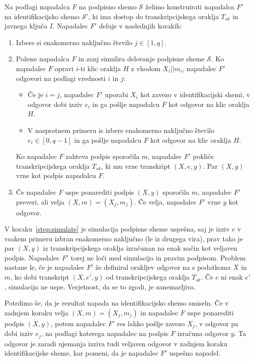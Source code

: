 \documentclass[isrm2, tisk]{fmfdelo}
\begin{document}
\begin{dokaz}
    Na podlagi napadalca $F$ na podpisno shemo $\mathcal{S}$ želimo konstruirati napadalca $F'$
    na identifikacijsko shemo $\mathcal{S'}$, ki ima dostop do transkripcijskega oraklja $T_{sk}$
    in javnega ključa $I$. Napadalec $F'$ deluje v naslednjih korakih:
    \begin{enumerate}
        \item Izbere si enakomerno naključno število $j \in [1, q]$.
        \item Požene napadalca $F$ in zanj simulira delovanje podpisne sheme $\mathcal{S}$.
            Ko napadalec $F$ opravi $i$-ti klic oraklja $H$ z vhodom $X_i || m_i$, napadalec $F'$
            odgovori na podlagi vrednosti $i$ in $j$:
            \begin{itemize}
                \item Če je $i = j$, napadalec $F'$ uporabi $X_i$ kot zavezo v identifikacijski
                    shemi, v odgovor dobi izziv $e_i$ in ga pošlje napadalcu $F$ kot odgovor na
                    klic oraklja $H$.
                \item V nasprotnem primeru is izbere enakomerno naključno število $e_i \in [0, q-1]$ in ga
                    pošlje napadalcu $F$ kot odgovor na klic oraklja $H$.
            \end{itemize}
            Ko napadalec $F$ zahteva podpis sporočila $m$, napadalec $F'$ pokliče transkripcijskega
            oraklja $T_{sk}$, ki mu vrne transkript $(X, e, y)$. Par $(X, y)$ vrne kot podpis
            napadalcu $F$.
        \label{step:simulate}
        \item Če napadalec $F$ uspe ponarediti podpis $(X, y)$ sporočila $m$, napadalec $F'$ preveri,
            ali velja $(X, m) = (X_j, m_j)$. Če velja, napadalec $F'$ vrne $y$ kot odgovor.
    \end{enumerate}
    V koraku~\ref{step:simulate} je simulacija podpisne sheme uspešna, saj je izziv $e$ v vsakem
    primeru izbran enakomerno naključno (le iz drugega vira), prav tako je par $(X, y)$ iz
    transkripcijskega oraklja izračunan na enak način kot veljaven podpis. Napadalec $F'$ torej ne
    loči med simulacijo in pravim podpisom. Problem nastane le, če je napadalec $F'$ že definiral
    orakljev odgovor na s podatkoma $X$ in $m$, ko dobi transkript $(X, e', y)$ od transkripcijskega
    oraklja $T_{sk}$. Če $e$ ni enak $e'$, simulacija ne uspe. Verjetnost, da se to zgodi, je
    zanemarljiva.

    Potrdimo še, da je rezultat napada na identifikacijsko shemo smiseln. Če v zadnjem koraku velja
    $(X, m) = (X_j, m_j)$ in napadalec $F$ uspe ponarediti podpis $(X, y)$, potem napadalec $F'$
    res lahko pošlje zavezo $X_j$, v odgovor pa dobi izziv $e_j$, na podlagi katerega napadalec na
    podpis $F$ izračuna odgovor $y$. Ta odgovor je zaradi ujemanja izziva tudi veljaven odgovor
    v zadnjem koraku identifikacijske sheme, kar pomeni, da je napadalec $F'$ uspešno napadel.


\end{dokaz}
\end{document}
